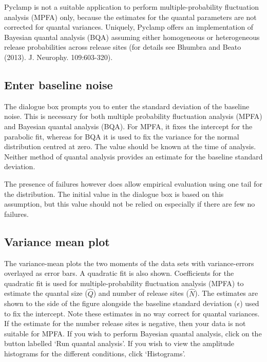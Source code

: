 \documentclass{article}
\begin{document}
Pyclamp is not a suitable application to perform multiple-probability fluctuation analysis (MPFA) only, because the
estimates for the quantal parameters are not corrected for quantal variances. Uniquely, Pyclamp offers an implementation
of Bayesian quantal analysis (BQA) assuming either homogeneous or heterogeneous release probabilities across release
sites (for details see Bhumbra and Beato (2013). J. Neurophy. 109:603-320).

\subsection{Enter baseline noise}

The dialogue box prompts you to enter the standard deviation of the baseline noise. This is necessary for both multiple
probability fluctuation analysis (MPFA) and Bayesian quantal analysis (BQA). For MPFA, it fixes the intercept for the
parabolic fit, whereas for BQA it is used to fix the variance for the normal distribution centred at zero. The value
should be known at the time of analysis. Neither method of quantal analysis provides an estimate for the baseline
standard deviation. 

The presence of failures however does allow empirical evaluation using one tail for the distribution. The initial value
in the dialogue box is based on this assumption, but this value should not be relied on especially if there are few no
failures.

\subsection{Variance mean plot}

The variance-mean plots the two moments of the data sets with variance-errors overlayed as error bars. A quadratic fit
is also shown. Coefficients for the quadratic fit is used for multiple-probability fluctuation analysis (MPFA) to
estimate the quantal size ($\hat{Q}$) and number of release sites ($\hat{N}$). The estimates are shown to the side of
the figure alongside the baseline standard deviation ($\epsilon$) used to fix the intercept. Note these estimates in no
way correct for quantal variances. If the estimate for the number release sites is negative, then your data is not
suitable for MPFA. If you wish to perform Bayesian quantal analysis, click on the button labelled `Run quantal
analysis'. If you wish to view the amplitude histograms for the different conditions, click `Histograms'.
\end{document}

